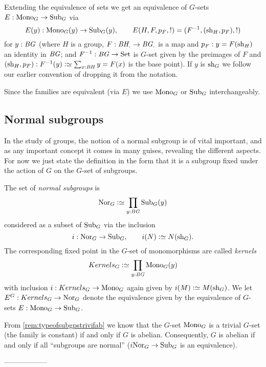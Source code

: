 Extending the equivalence of sets we get an equivalence of $G$-sets $E:\mathrm{Mono}_G\to\mathrm{Sub}_G$ via
$$E(y):\mathrm{Mono}_G(y)\to\mathrm{Sub}_G(y),\qquad E(H,F,p_F,!)=(F^{-1}, (\mathrm{sh}_H,p_F),!)
$$
for $y:\mathit{B}\mathit{G}$ (where $H$ is a group, $F:\BH_\div\to \BG_\div$ is a map and $p_F:y=F(\mathrm{sh}_H)$ an identity in $\mathit{B}\mathit{G}$; and $F^{-1}:\mathit{B}\mathit{G}\to\mathrm{Set}$ is $G$-set given by the preimages of $F$ and $(\sh_H,p_F):F^{-1}(y)\defequi \sum_{x:\BH}y=F(x)$ is the base point).  If $y$ is $\mathrm{sh}_G$ we follow our earlier convention of dropping it from the notation.


Since the families are equivalent (via $E$) we use $\mathrm{Mono}_G$ or $\mathrm{Sub}_G$ interchangeably.

\subsection{Normal subgroups}
\label{sec:normal}
\newcommand{\typekernel}{Kernels}
In the study of groups, the notion of a normal subgroup is of vital important, and as any important concept it comes in many guises, revealing the different aspects.
For now we just state the definition in the form that it is a subgroup fixed under the action of $G$ on the $G$-set of subgroups.
\begin{definition}
  \label{def:normalsubgroup}
  The set of \emph{normal subgroups} is
  $$\typenormal_G\defequi\prod_{y:\BG}\typesubgroup_G(y)$$
  considered as a subset of $\mathrm{Sub}_G$ via the inclusion
  $$i:\typenormal_G\to\typesubgroup_G,\qquad i(N)\defequi N(\sh_G).$$
  The corresponding fixed point in the $G$-set of monomorphisms are called \emph{kernels}
  $$\typekernel_G\defequi\prod_{y:\BG}\typemono_G(y)$$
  with inclusion $i:\typekernel_G\to \typemono_G$ again given by $i(M)\defequi M(\sh_G)$.
  We let $E^G:\typekernel_G\to\typenormal_G$ denote the equivalence given by the equivalence of $G$-sets $E:\mathrm{Mono}_G\to\mathrm{Sub}_G$.
\end{definition}
\begin{remark}
  From \cref{rem:typeofsubgpstrivifab} we know that the $G$-set $\mathrm{Mono}_G$ is a trivial $G$-set (the family is constant) if and only if $G$ is abelian.  Consequently, $G$ is abelian if and only if all ``subgroups are normal'' (\ie $i\mathrm{Nor}_G\to\mathrm{Sub}_G$ is an equivalence).
\end{remark}

------------------



